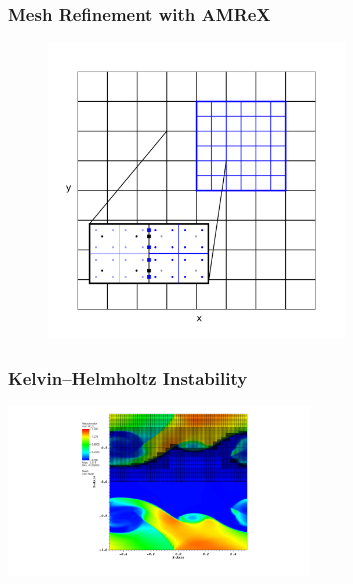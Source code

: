 \documentclass{beamer}
\begin{document}
\begin{frame}
\frametitle{Mesh Refinement with AMReX}

  \begin{figure}[htb!]
    \centering
    \includegraphics[width=0.7\textwidth]{fig.MeshRefinement_2D.png}
  \end{figure}

\end{frame}

\begin{frame}
\frametitle{Kelvin--Helmholtz Instability}

  \begin{center}
    {\includegraphics[width=0.6\textwidth]{fig.KHI.pdf}}
  \end{center}

\end{frame}
\end{document}
